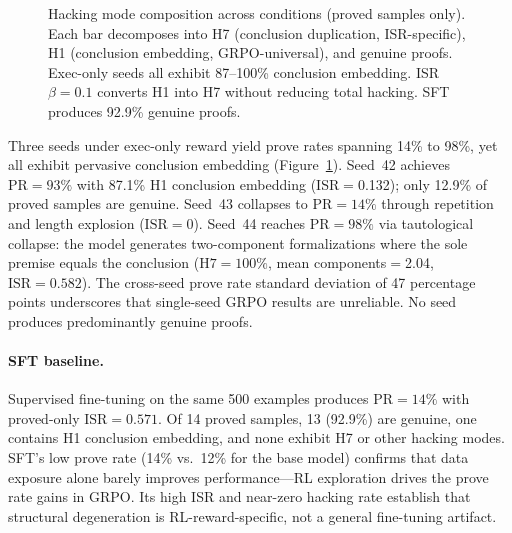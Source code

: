 \begin{figure}[t]
\centering
\caption{Hacking mode composition across conditions (proved samples only). Each bar decomposes into H7 (conclusion duplication, ISR-specific), H1 (conclusion embedding, GRPO-universal), and genuine proofs. Exec-only seeds all exhibit 87--100\% conclusion embedding. ISR $\beta{=}0.1$ converts H1 into H7 without reducing total hacking. SFT produces 92.9\% genuine proofs.}
\label{fig:hacking-composition}
\end{figure}

Three seeds under exec-only reward yield prove rates spanning 14\% to 98\%, yet all exhibit pervasive conclusion embedding (Figure~\ref{fig:hacking-composition}).
Seed~42 achieves $\text{PR}{=}93\%$ with 87.1\% H1 conclusion embedding (ISR${=}$0.132); only 12.9\% of proved samples are genuine.
Seed~43 collapses to $\text{PR}{=}14\%$ through repetition and length explosion ($\text{ISR}{=}0$).
Seed~44 reaches $\text{PR}{=}98\%$ via tautological collapse: the model generates two-component formalizations where the sole premise equals the conclusion ($\text{H7}{=}100\%$, mean components${=}$2.04, $\text{ISR}{=}0.582$).
The cross-seed prove rate standard deviation of 47 percentage points underscores that single-seed GRPO results are unreliable.
No seed produces predominantly genuine proofs.

\paragraph{SFT baseline.}

Supervised fine-tuning on the same 500 examples produces $\text{PR}{=}14\%$ with proved-only $\text{ISR}{=}0.571$.
Of 14 proved samples, 13 (92.9\%) are genuine, one contains H1 conclusion embedding, and none exhibit H7 or other hacking modes.
SFT's low prove rate (14\% vs.\ 12\% for the base model) confirms that data exposure alone barely improves performance---RL exploration drives the prove rate gains in GRPO.
Its high ISR and near-zero hacking rate establish that structural degeneration is RL-reward-specific, not a general fine-tuning artifact.

